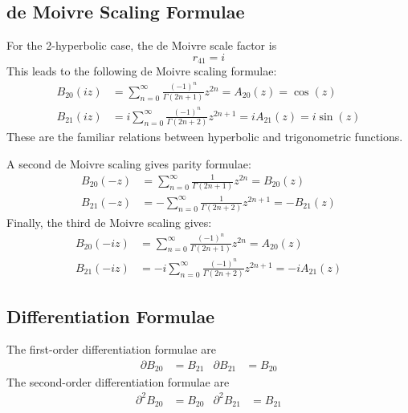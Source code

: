 \subsection{de Moivre Scaling Formulae}
For the 2-hyperbolic case, the de Moivre scale factor is
\begin{equation}
    r_{41} = i
\end{equation}
This leads to the following de Moivre scaling formulae:
\begin{align}
    B_{20}\left( i  z\right) &= \sum_{n = 0}^{\infty} \frac{(-1)^{n}}{\Gamma\left(2n + 1\right)} z^{2n} = A_{20}(z) = \cos(z) \\
    B_{21}\left( i  z\right) &= i \sum_{n = 0}^{\infty} \frac{(-1)^{n}}{\Gamma\left(2n + 2\right)} z^{2n+1} = iA_{21}(z) = i \sin(z)
\end{align}
These are the familiar relations between hyperbolic and trigonometric functions.

A second de Moivre scaling gives parity formulae:
\begin{align}
    B_{20}\left( -z\right) &= \sum_{n = 0}^{\infty} \frac{1}{\Gamma\left(2n + 1\right)} z^{2n} = B_{20}(z) \\
    B_{21}\left( -z\right) &= -\sum_{n = 0}^{\infty} \frac{1}{\Gamma\left(2n + 2\right)} z^{2n+1} = -B_{21}(z)
\end{align}
Finally, the third de Moivre scaling gives:
\begin{align}
    B_{20}\left( -i  z\right) &= \sum_{n = 0}^{\infty} \frac{(-1)^{n}}{\Gamma\left(2n + 1\right)} z^{2n} = A_{20}(z) \\
    B_{21}\left( -i  z\right) &= -i \sum_{n = 0}^{\infty} \frac{(-1)^{n}}{\Gamma\left(2n + 2\right)} z^{2n+1} = -iA_{21}(z)
\end{align}
\subsection{Differentiation Formulae}
The first-order differentiation formulae are
\begin{align}
    \partial B_{20} &= B_{21} & \partial B_{21} &= B_{20}
\end{align}
The second-order differentiation formulae are
\begin{align}
    \partial^{2} B_{20} &= B_{20} & \partial^{2} B_{21} &= B_{21}
\end{align}
